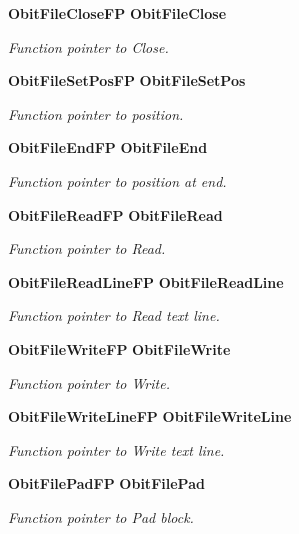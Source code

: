 \begin{CompactItemize}
{\bf Obit\-File\-Close\-FP} {\bf Obit\-File\-Close}
\begin{CompactList}\small\item\em Function pointer to Close. \item\end{CompactList}\item 
{\bf Obit\-File\-Set\-Pos\-FP} {\bf Obit\-File\-Set\-Pos}
\begin{CompactList}\small\item\em Function pointer to position. \item\end{CompactList}\item 
{\bf Obit\-File\-End\-FP} {\bf Obit\-File\-End}
\begin{CompactList}\small\item\em Function pointer to position at end. \item\end{CompactList}\item 
{\bf Obit\-File\-Read\-FP} {\bf Obit\-File\-Read}
\begin{CompactList}\small\item\em Function pointer to Read. \item\end{CompactList}\item 
{\bf Obit\-File\-Read\-Line\-FP} {\bf Obit\-File\-Read\-Line}
\begin{CompactList}\small\item\em Function pointer to Read text line. \item\end{CompactList}\item 
{\bf Obit\-File\-Write\-FP} {\bf Obit\-File\-Write}
\begin{CompactList}\small\item\em Function pointer to Write. \item\end{CompactList}\item 
{\bf Obit\-File\-Write\-Line\-FP} {\bf Obit\-File\-Write\-Line}
\begin{CompactList}\small\item\em Function pointer to Write text line. \item\end{CompactList}\item 
{\bf Obit\-File\-Pad\-FP} {\bf Obit\-File\-Pad}
\begin{CompactList}\small\item\em Function pointer to Pad block. \item\end{CompactList}\item 

\end{CompactItemize}
